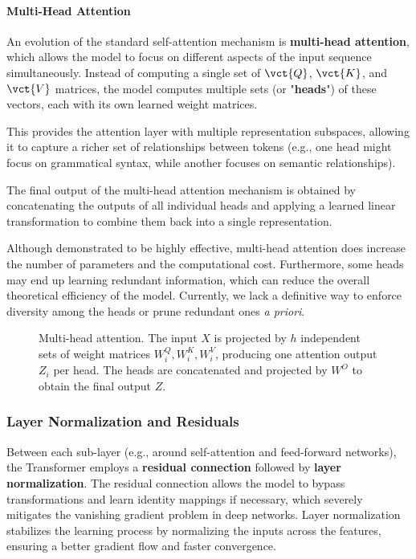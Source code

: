 \paragraph{Multi-Head Attention}
An evolution of the standard self-attention mechanism is \textbf{multi-head attention}, which allows the model to focus on different aspects of the input sequence simultaneously.
Instead of computing a single set of \(\vct{Q}\), \(\vct{K}\), and \(\vct{V}\) matrices, the model computes multiple sets (or "\textbf{heads}") of these vectors, each with its own learned weight matrices.

This provides the attention layer with multiple representation subspaces, allowing it to capture a richer set of relationships between tokens (e.g., one head might focus on grammatical syntax, while another focuses on semantic relationships).

The final output of the multi-head attention mechanism is obtained by concatenating the outputs of all individual heads and applying a learned linear transformation to combine them back into a single representation.

Although demonstrated to be highly effective, multi-head attention does increase the number of parameters and the computational cost. Furthermore, some heads may end up learning redundant information, which can reduce the overall theoretical efficiency of the model. Currently, we lack a definitive way to enforce diversity among the heads or prune redundant ones \textit{a priori}.

\begin{figure}[H]
    \centering
    \resizebox{\textwidth}{!}{}
    \caption{Multi-head attention. The input $X$ is projected by $h$ independent sets of weight matrices $W_i^Q, W_i^K, W_i^V$, producing one attention output $Z_i$ per head. The heads are concatenated and projected by $W^O$ to obtain the final output $Z$.}
\end{figure}

\subsubsection{Layer Normalization and Residuals}
Between each sub-layer (e.g., around self-attention and feed-forward networks), the Transformer employs a \textbf{residual connection} followed by \textbf{layer normalization}.
The residual connection allows the model to bypass transformations and learn identity mappings if necessary, which severely mitigates the vanishing gradient problem in deep networks.
Layer normalization stabilizes the learning process by normalizing the inputs across the features, ensuring a better gradient flow and faster convergence.

